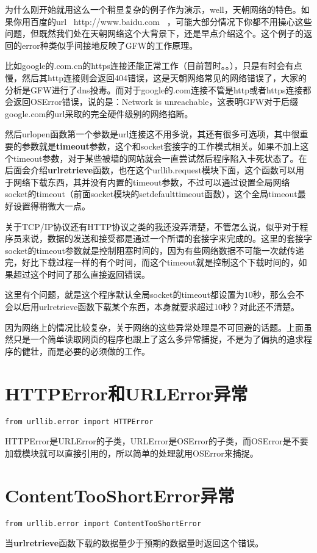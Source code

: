 \documentclass[12pt,oneside]{book}
\begin{document}
\begin{common-format}
为什么刚开始就用这么一个稍显复杂的例子作为演示，well，天朝网络的特色。如果你用百度的url ~http://www.baidu.com~ ，可能大部分情况下你都不用操心这些问题，但既然我们处在天朝网络这个大背景下，还是早点介绍这个。这个例子的返回的error种类似乎间接地反映了GFW的工作原理。

比如google的.com.cn的https连接还能正常工作（目前暂时。。），只是有时会有点慢，然后其http连接则会返回404错误，这是天朝网络常见的网络错误了，大家的分析是GFW进行了dns投毒。而对于google的.com连接不管是http或者https连接都会返回OSError错误，说的是：Network is unreachable，这表明GFW对于后缀google.com的url采取的完全硬件级别的网络掐断。

然后urlopen函数第一个参数是url连接这不用多说，其还有很多可选项，其中很重要的参数就是\textbf{timeout}参数，这个和socket套接字的工作模式相关。如果不加上这个timeout参数，对于某些被墙的网站就会一直尝试然后程序陷入卡死状态了。在后面会介绍\textbf{urlretrieve}函数，也在这个urllib.request模块下面，这个函数可以用于网络下载东西，其并没有内置的timeout参数，不过可以通过设置全局网络socket的timeout（前面socket模块的setdefaulttimeout函数），这个全局timeout最好设置得稍微大一点。

关于TCP/IP协议还有HTTP协议之类的我还没弄清楚，不管怎么说，似乎对于程序员来说，数据的发送和接受都是通过一个所谓的套接字来完成的。这里的套接字socket的timeout参数就是控制阻塞时间的，因为有些网络数据不可能一次就传递完，好比下载过程一样的有个时间，而这个timeout就是控制这个下载时间的，如果超过这个时间了那么直接返回错误。

这里有个问题，就是这个程序默认全局socket的timeout都设置为10秒，那么会不会以后用urlretrieve函数下载某个东西，本身就要求超过10秒？对此还不清楚。

因为网络上的情况比较复杂，关于网络的这些异常处理是不可回避的话题。上面虽然只是一个简单读取网页的程序也跟上了这么多异常捕捉，不是为了偏执的追求程序的健壮，而是必要的必须做的工作。


\section{HTTPError和URLError异常}
\begin{Verbatim}
from urllib.error import HTTPError
\end{Verbatim}
HTTPError是URLError的子类，URLError是OSError的子类，而OSError是不要加载模块就可以直接引用的，所以简单的处理就用OSError来捕捉。

\section{ContentTooShortError异常}
\begin{Verbatim}
from urllib.error import ContentTooShortError
\end{Verbatim}
当\textbf{urlretrieve}函数下载的数据量少于预期的数据量时返回这个错误。




\end{common-format}
\end{document}
